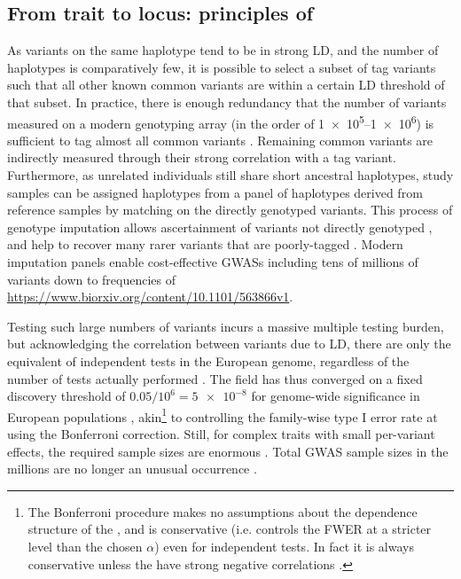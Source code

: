 \begin{outline}
\autocite{gallagher2018PostGWASEraAssociation,tam2019BenefitsLimitationsGenomewide}

\subsection{From trait to locus: principles of }

As variants on the same haplotype tend to be in strong \gls{LD}, and the number of haplotypes is comparatively few, 
it is possible to select a subset of tag variants such that all other known common variants are within a certain \gls{LD} threshold of that subset. 
In practice, there is enough redundancy that the number of variants measured on a modern genotyping array (in the order of \numrange[retain-unity-mantissa=false]{1e5}{1e6}) is sufficient to tag almost all common variants  \autocite{theinternationalhapmapconsortium2005HaplotypeMapHuman,barrett2006EvaluatingCoverageGenomewide}.
Remaining common variants are indirectly measured through their strong correlation with a tag variant.
Furthermore, as unrelated individuals still share short ancestral haplotypes, 
study samples can be assigned haplotypes from a panel of haplotypes derived from reference samples by matching on the directly genotyped variants.
This process of genotype imputation allows ascertainment of variants not directly genotyped \autocite{das2018GenotypeImputationLarge},
and help to recover many rarer variants that are poorly-tagged \autocite{visscher201710YearsGWAS}.
Modern imputation panels enable cost-effective \glspl{GWAS} including tens of millions of variants down to frequencies of  \url{https://www.biorxiv.org/content/10.1101/563866v1}.

Testing such large numbers of variants incurs a massive multiple testing burden, but acknowledging the correlation between variants due to \gls{LD},
there are only the equivalent of  independent tests in the European genome, regardless of the number of tests actually performed \autocite{peer2008EstimationMultipleTesting}.
The field has thus converged on a fixed discovery threshold of $0.05 / 10^6 = \num{5e-8}$ for genome-wide significance in European populations \autocite{jannot2015108HasEmerged}, akin\footnote{
    The Bonferroni procedure makes no assumptions about the dependence structure of the \pvalues, and is conservative (i.e. controls the \gls{FWER} at a stricter level than the chosen $\alpha$) even for independent tests. In fact it is always conservative unless the \pvalues have strong negative correlations \autocite{goeman2014MultipleHypothesisTesting}.
}
to controlling the family-wise type I error rate at using the Bonferroni correction.
Still, for complex traits with small per-variant effects, the required sample sizes are enormous \autocite{visscher201710YearsGWAS}.
Total \gls{GWAS} sample sizes in the millions are no longer an unusual occurrence \autocite{tam2019BenefitsLimitationsGenomewide}.


\end{outline}
